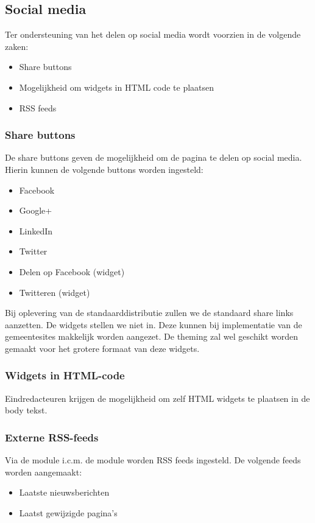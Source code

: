 \subsection{Social media}

Ter ondersteuning van het delen op social media wordt voorzien in de volgende zaken:
\begin{itemize}
\item Share buttons
\item Mogelijkheid om widgets in HTML code te plaatsen
\item RSS feeds
\end{itemize}

\subsubsection{Share buttons}

De share buttons geven de mogelijkheid om de pagina te delen op social media. Hierin kunnen de volgende buttons worden ingesteld:
\begin{itemize}
\item Facebook
\item Google+
\item LinkedIn
\item Twitter
\item Delen op Facebook (widget)
\item Twitteren (widget)
\end{itemize}

Bij oplevering van de standaarddistributie zullen we de standaard share links aanzetten. De widgets stellen we niet in. Deze kunnen bij implementatie van de gemeentesites makkelijk worden aangezet. De theming zal wel geschikt worden gemaakt voor het grotere formaat van deze widgets.

\subsubsection{Widgets in HTML-code}

Eindredacteuren krijgen de mogelijkheid om zelf HTML widgets te plaatsen in de body tekst.

\subsubsection{Externe RSS-feeds}

Via de  module i.c.m. de  module worden RSS feeds ingesteld. De volgende feeds worden aangemaakt:
\begin{itemize}
\item Laatste nieuwsberichten
\item Laatst gewijzigde pagina's
\end{itemize}

